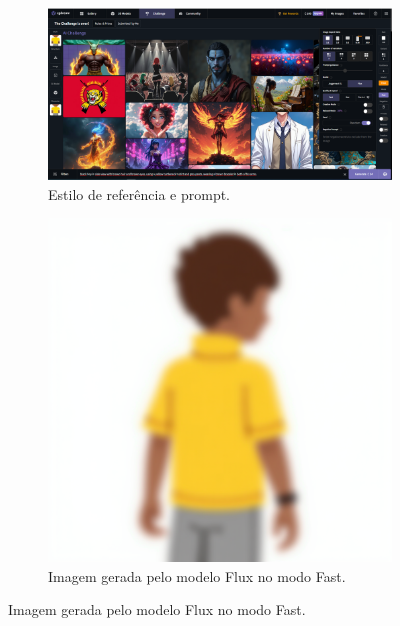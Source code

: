 \begin{figure}[htbp]
    \centering
    \caption{\small Processo da utilização 8 do CGDream (Personagem)}
    \label{fig:cgDream8}
    \begin{subfigure}{0.7\linewidth}
        \includegraphics[width=1\linewidth]{figs/cgDream/tela_char_FluxFast_estilo.PNG}
        \caption{\small Estilo de referência e prompt.}
        \label{fig:cgDream8a}
    \end{subfigure}
    \begin{subfigure}{0.35\linewidth}
        \centering
        \includegraphics[width=1\linewidth]{figs/cgDream/res_char_FluxFast_estilo1.png}
        \caption{\small Imagem gerada pelo modelo Flux no modo Fast.}

\end{subfigure}
\end{figure}
